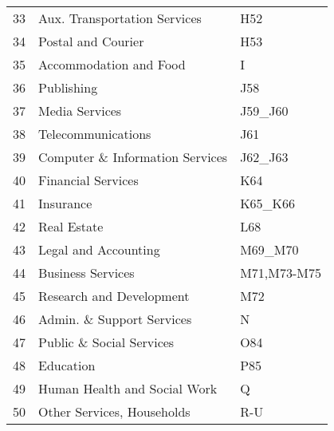 \documentclass[a4paper,12pt]{article}
\begin{document}
\begin{appendix}
\begin{table}[h!]
{\begin{tabular}{cll}
33&Aux. Transportation Services&H52\\
34&Postal and Courier&H53\\
35&Accommodation and Food&I\\
36&Publishing&J58\\
37&Media Services&J59\_J60\\
38&Telecommunications&J61\\
39&Computer \& Information Services&J62\_J63\\
40&Financial Services&K64\\
41&Insurance&K65\_K66\\
42&Real Estate &L68\\
43&Legal and Accounting&M69\_M70\\
44&Business Services&M71,M73-M75\\
45&Research and Development&M72\\
46&Admin. \& Support Services&N\\
47&Public \& Social Services&O84\\
48&Education&P85\\
49&Human Health and Social Work&Q\\
50&Other Services, Households&R-U\\
\bottomrule
\end{tabular}
}
\end{table}



\end{appendix}
\end{document}
